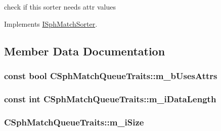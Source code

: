 check if this sorter needs attr values 



Implements \hyperlink{classISphMatchSorter_ae44238460e92263e6dda7de35e24d32c}{I\-Sph\-Match\-Sorter}.



\subsection{Member Data Documentation}
\hypertarget{classCSphMatchQueueTraits_ae1b172fd47189997ff938ef9d6228752}{
\subsubsection[{m\-\_\-b\-Uses\-Attrs}]{\setlength{\rightskip}{0pt plus 5cm}const bool C\-Sph\-Match\-Queue\-Traits\-::m\-\_\-b\-Uses\-Attrs\hspace{0.3cm}{\ttfamily [protected]}}}\label{classCSphMatchQueueTraits_ae1b172fd47189997ff938ef9d6228752}
\hypertarget{classCSphMatchQueueTraits_a9b091659866defd25f33ba9cacd447f1}{
\subsubsection[{m\-\_\-i\-Data\-Length}]{\setlength{\rightskip}{0pt plus 5cm}const {\bf int} C\-Sph\-Match\-Queue\-Traits\-::m\-\_\-i\-Data\-Length\hspace{0.3cm}{\ttfamily [private]}}}\label{classCSphMatchQueueTraits_a9b091659866defd25f33ba9cacd447f1}
\hypertarget{classCSphMatchQueueTraits_a162ecbce6bdcc3b700835548b8e1a437}{
\subsubsection[{m\-\_\-i\-Size}]{ C\-Sph\-Match\-Queue\-Traits\-::m\-\_\-i\-Size\hspace{0.3cm}{\ttfamily [protected]}}}\label{classCSphMatchQueueTraits_a162ecbce6bdcc3b700835548b8e1a437}
